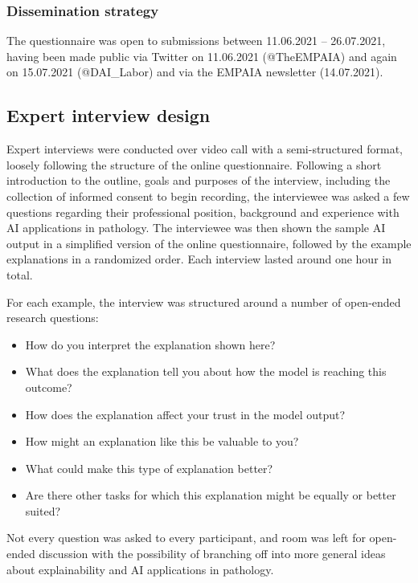 \documentclass[final,5p,times,twocolumn,hyphens]{elsarticle}
\begin{document}
\subsubsection{Dissemination strategy}

The questionnaire was open to submissions between 11.06.2021 -- 26.07.2021, having been made public via Twitter on 11.06.2021 (@TheEMPAIA) and again on 15.07.2021 (@DAI\_Labor) and via the EMPAIA newsletter (14.07.2021).

\subsection{Expert interview design}
\label{sec:interviewdesign}
Expert interviews were conducted over video call with a semi-structured format, loosely following the structure of the online questionnaire. Following a short introduction to the outline, goals and purposes of the interview, including the collection of informed consent to begin recording, the interviewee was asked a few questions regarding their professional position, background and experience with AI applications in pathology. The interviewee was then shown the sample AI output in a simplified version of the online questionnaire, followed by the example explanations in a randomized order. Each interview lasted around one hour in total.

For each example, the interview was structured around a number of open-ended research questions: 

\begin{itemize}
    \item How do you interpret the explanation shown here?
    \item What does the explanation tell you about how the model is reaching this outcome?
    \item How does the explanation affect your trust in the model output?
    \item How might an explanation like this be valuable to you?
    \item What could make this type of explanation better?
    \item Are there other tasks for which this explanation might be equally or better suited?
\end{itemize}

Not every question was asked to every participant, and room was left for open-ended discussion with the possibility of branching off into more general ideas about explainability and AI applications in pathology.
\end{document}
